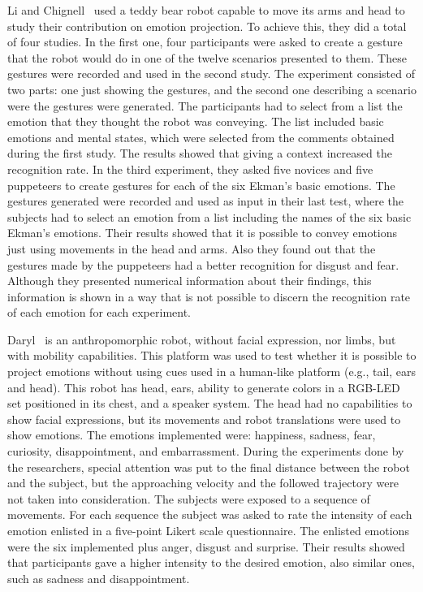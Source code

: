 Li and Chignell~\cite{Li2011} used a teddy bear robot capable to move its arms and head to study their contribution on emotion projection. To achieve this, they did a total of four studies. In the first one, four participants were asked to create a gesture that the robot would do in one of the twelve scenarios presented to them. These gestures were recorded and used in the second study. The experiment consisted of two parts: one just showing the gestures, and the second one describing a scenario were the gestures were generated. The participants had to select from a list the emotion that they thought the robot was conveying. The list included basic emotions and mental states, which were selected from the comments obtained during the first study. The results showed that giving a context increased the recognition rate. In the third experiment, they asked five novices and five puppeteers to create gestures for each of the six Ekman's basic emotions. The gestures generated were recorded and used as input in their last test, where the subjects had to select an emotion from a list including the names of the six basic Ekman's emotions. Their results showed that it is possible to convey emotions just using movements in the head and arms. Also they found out that the gestures made by the puppeteers had a better recognition for disgust and fear. Although they presented numerical information about their findings, this information is shown in a way that is not possible to discern the recognition rate of each emotion for each experiment. 

Daryl~\cite{Arras2012} is an anthropomorphic robot, without facial expression, nor limbs, but with mobility capabilities. This platform was used to test whether it is possible to project emotions without using cues used in a human-like platform (e.g., tail, ears and head). This robot has head, ears, ability to generate colors in a RGB-LED set positioned in its chest, and a speaker system. The head had no capabilities to show facial expressions, but its movements and robot translations were used to show emotions. The emotions implemented were: happiness, sadness, fear, curiosity, disappointment, and embarrassment. During the experiments done by the researchers, special attention was put to the final distance between the robot and the subject, but the approaching velocity and the followed trajectory were not taken into consideration. The subjects were exposed to a sequence of movements. For each sequence the subject was asked to rate the intensity of each emotion enlisted in a five-point Likert scale questionnaire. The enlisted emotions were the six implemented plus anger, disgust and surprise. Their results showed that participants gave a higher intensity to the desired emotion, also similar ones, such as sadness and disappointment. 

